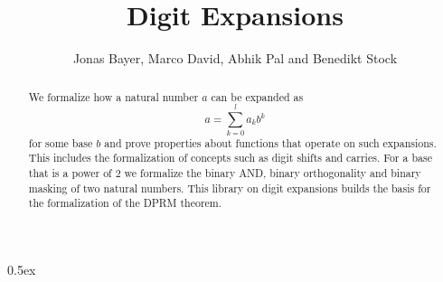 \documentclass[11pt,a4paper]{article}
\begin{document}
\title{Digit Expansions}

\author{Jonas Bayer, Marco David, Abhik Pal and Benedikt Stock}

\maketitle


\begin{abstract}
We formalize how a natural number $a$ can be expanded as
\[ a = \sum_{k=0}^l a_k b^k \]
for some base $b$ and prove properties about functions that operate on such expansions. This includes the formalization of concepts such as digit shifts and carries. For a base that is a power of $2$ we formalize the binary AND, binary orthogonality and binary masking of two natural numbers. This library on digit expansions builds the basis for the formalization of the DPRM theorem.
\end{abstract}


\tableofcontents

\newpage

\parindent 0pt\parskip 0.5ex

\newpage





\end{document}
